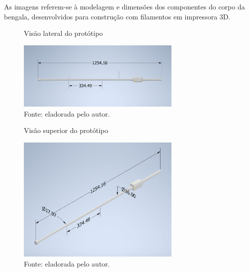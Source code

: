 \label{ap:C}

As imagens referem-se à modelagem e dimensões dos componentes do corpo da bengala, desenvolvidos para construção com filamentos em impressora 3D.

    \begin{figure}[h!]
        \captionsetup{width=1\textwidth}
        \caption{\label{fig:prototipo1} Visão lateral do protótipo }
        \centering
        \includegraphics[width=0.7\textwidth]{figuras/prototipo1.jpeg} 
        \caption*{Fonte: eladorada pelo autor.}
    \end{figure}

    \begin{figure}[h!]
        \captionsetup{width=1\textwidth}
        \caption{\label{fig:prototipo2} Visão superior do protótipo}
        \centering
        \includegraphics[width=0.7\textwidth]{figuras/prototipo2.jpeg} 
        \caption*{Fonte: eladorada pelo autor.}
    \end{figure}

